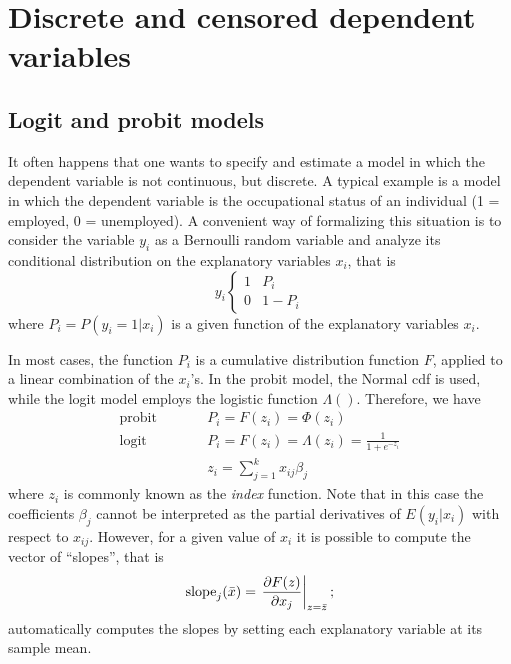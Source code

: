\chapter{Discrete and censored dependent variables}
\label{discr-models}

\section{Logit and probit models}
\label{sec:logit-probit}

It often happens that one wants to specify and estimate a model in
which the dependent variable is not continuous, but discrete. A
typical example is a model in which the dependent variable is the
occupational status of an individual (1 = employed, 0 = unemployed). A
convenient way of formalizing this situation is to consider the
variable $y_i$ as a Bernoulli random variable and analyze its
conditional distribution on the explanatory variables $x_i$, that is
\begin{equation}
  \label{eq:qr-Bernoulli}
  y_i \left\{ 
    \begin{array}{ll} 1 & P_i \\ 0 & 1 - P_i \end{array}
    \right. 
\end{equation}
where $P_i = P(y_i = 1 | x_i) $ is a given function of the explanatory
variables $x_i$.

In most cases, the function $P_i$ is a cumulative distribution
function $F$, applied to a linear combination of the $x_i$'s. In the
probit model, the Normal cdf is used, while the logit model employs
the logistic function $\Lambda()$. Therefore, we have
\begin{eqnarray}
  \label{eq:qr-link}
  \textrm{probit} & \qquad & P_i = F(z_i) = \Phi(z_i)  \\
  \textrm{logit}  & \qquad & P_i = F(z_i) = \Lambda(z_i) = \frac{1}{1 + e^{-z_i}} \\
  & &z_i = \sum_{j=1}^k x_{ij} \beta_j
\end{eqnarray}
where $z_i$ is commonly known as the \emph{index} function. Note that
in this case the coefficients $\beta_j$ cannot be interpreted as the
partial derivatives of $E(y_i | x_i)$ with respect to
$x_{ij}$. However, for a given value of $x_i$ it is possible to
compute the vector of ``slopes'', that is
\[
  \mathrm{slope}_j(\bar{x}) = \left. \frac{\partial F(z)}{\partial x_j} \right|_{z =
    \bar{z}} ;
\]
 automatically computes the slopes by setting each
explanatory variable at its sample mean.

